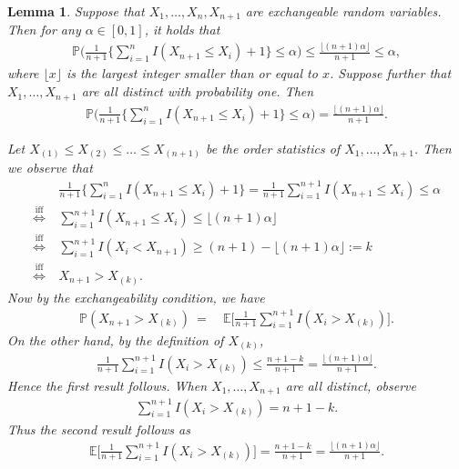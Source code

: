 \documentclass[12pt]{article}
\newtheorem{lemma}[theorem]{Lemma}
\newenvironment{proof}[1][Proof]{\begin{trivlist}
\item[\hskip \labelsep {\bfseries #1}]}{\end{trivlist}}
\begin{document}
\begin{appendices}
\begin{lemma}
	Suppose that $X_1,\ldots,X_n,X_{n+1}$ are exchangeable random variables. Then for any $\alpha \in [0,1]$, it holds that 
	\begin{align*}
	\mathbb{P} \biggl( \frac{1}{n+1} \bigg\{\sum_{i=1}^n I(X_{n+1} \leq X_i)  + 1 \bigg\} \leq \alpha \biggr) \leq \frac{\lfloor{(n+1)\alpha\rfloor}}{n+1} \leq \alpha,
	\end{align*}
	where $\lfloor{x\rfloor}$ is the largest integer smaller than or equal to $x$. Suppose further that $X_1,\ldots,X_{n+1}$ are all distinct with probability one. Then
	\begin{align*}
	\mathbb{P} \biggl( \frac{1}{n+1} \bigg\{\sum_{i=1}^n I(X_{n+1} \leq X_i)  + 1 \bigg\} \leq \alpha \biggr) = \frac{\lfloor{ (n+1)\alpha\rfloor}}{n+1}.
	\end{align*}
	\begin{proof}
		Let $X_{(1)} \leq X_{(2)} \leq \ldots \leq X_{(n+1)}$ be the order statistics of $X_1,\ldots,X_{n+1}$. Then we observe that
		\begin{align*}
		& \frac{1}{n+1} \bigg\{\sum_{i=1}^n I(X_{n+1} \leq X_i)  + 1 \bigg\} = \frac{1}{n+1} \sum_{i=1}^{n+1} I(X_{n+1} \leq X_i)  \leq \alpha \\[.5em]
		\overset{\text{iff}}{\Longleftrightarrow} ~ & \sum_{i=1}^{n+1} I(X_{n+1} \leq X_i)  \leq \lfloor{(n+1)\alpha\rfloor} \\[.5em]
		\overset{\text{iff}}{\Longleftrightarrow} ~  & \sum_{i=1}^{n+1} I(X_i < X_{n+1}) \geq (n+1) - \lfloor{(n+1)\alpha\rfloor}:= k \\[.5em]
		\overset{\text{iff}}{\Longleftrightarrow} ~ & X_{n+1} > X_{(k)}.
		\end{align*}
		Now by the exchangeability condition, we have
		\begin{align*}
		\mathbb{P}(X_{n+1} > X_{(k)}) ~=~& \mathbb{E}\bigg[ \frac{1}{n+1} \sum_{i=1}^{n+1} I(X_{i} > X_{(k)}) \bigg].
		\end{align*}
		On the other hand, by the definition of $X_{(k)}$, 
		\begin{align*}
		\frac{1}{n+1} \sum_{i=1}^{n+1} I(X_{i} > X_{(k)}) \leq \frac{n+1 - k}{n+1} = \frac{ \lfloor{(n+1)\alpha\rfloor} }{n+1}.
		\end{align*}
		Hence the first result follows. When $X_1,\ldots,X_{n+1}$ are all distinct, observe
		\begin{align*}
		\sum_{i=1}^{n+1} I(X_{i} > X_{(k)}) = n+1-k.
		\end{align*}
		Thus the second result follows as
		\begin{align*}
		\mathbb{E}\bigg[ \frac{1}{n+1} \sum_{i=1}^{n+1} I(X_{i} > X_{(k)}) \bigg] = \frac{n+1-k}{n+1} =  \frac{ \lfloor{(n+1)\alpha\rfloor} }{n+1}.
		\end{align*}
	\end{proof} 
\end{lemma}
\vfill


\end{appendices}
\end{document}
